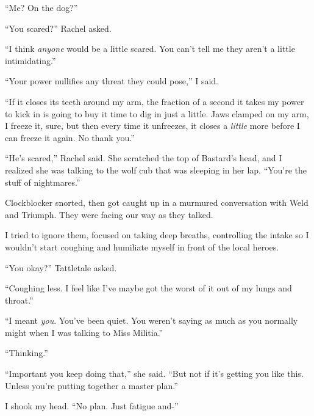 ``Me?  On the dog?''



``You scared?'' Rachel asked.



``I think \emph{anyone} would be a little scared.  You can't tell me they aren't a little intimidating.''



``Your power nullifies any threat they could pose,'' I said.



``If it closes its teeth around my arm, the fraction of a second it takes my power to kick in is going to buy it time to dig in just a little.  Jaws clamped on my arm, I freeze it, sure, but then every time it unfreezes, it closes a \emph{little} more before I can freeze it again.  No thank you.''



``He's scared,'' Rachel said.  She scratched the top of Bastard's head, and I realized she was talking to the wolf cub that was sleeping in her lap.  ``You're the stuff of nightmares.''



Clockblocker snorted, then got caught up in a murmured conversation with Weld and Triumph.  They were facing our way as they talked.



I tried to ignore them, focused on taking deep breaths, controlling the intake so I wouldn't start coughing and humiliate myself in front of the local heroes.



``You okay?'' Tattletale asked.



``Coughing less.  I feel like I've maybe got the worst of it out of my lungs and throat.''



``I meant \emph{you}.  You've been quiet.  You weren't saying as much as you normally might when I was talking to Miss Militia.''



``Thinking.''



``Important you keep doing that,'' she said.  ``But not if it's getting you like this.  Unless you're putting together a master plan.''



I shook my head.  ``No plan.  Just fatigue and-''



